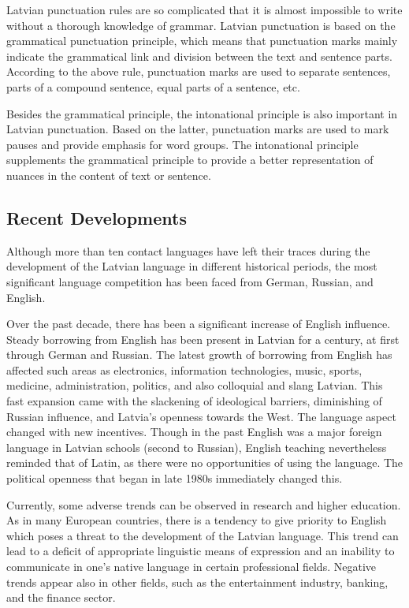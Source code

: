 \begin{multicols}{2}
Latvian punctuation rules are so complicated that it is almost impossible to write without a thorough knowledge of grammar.
Latvian punctuation is based on the grammatical punctuation principle, which means that punctuation marks mainly indicate the grammatical link and division between the text and sentence parts.
According to the above rule, punctuation marks are used to separate sentences, parts of a compound sentence, equal parts of a sentence, etc.

Besides the grammatical principle, the intonational principle is also important in Latvian punctuation.
Based on the latter, punctuation marks are used to mark pauses and provide emphasis for word groups.
The intonational principle supplements the grammatical principle to provide a better representation of nuances in the content of text or sentence.

\subsection{Recent Developments}

Although more than ten contact languages have left their traces during the development of the Latvian language in different historical periods, the most significant language competition has been faced from German, Russian, and English.

Over the past decade, there has been a significant increase of English influence.
Steady borrowing from English has been present in Latvian for a century, at first through German and Russian.
The latest growth of borrowing from English has affected such areas as electronics, information technologies, music, sports, medicine, administration, politics, and also colloquial and slang Latvian.
This fast expansion came with the slackening of ideological barriers, diminishing of Russian influence, and Latvia's openness towards the West.
The language aspect changed with new incentives.
Though in the past English was a major foreign language in Latvian schools (second to Russian), English teaching nevertheless reminded that of Latin, as there were no opportunities of using the language.
The political openness that began in late 1980s immediately changed this.

Currently, some adverse trends can be observed in research and higher education.
As in many European countries, there is a tendency to give priority to English which poses a threat to the development of the Latvian language.
This trend can lead to a deficit of appropriate linguistic means of expression and an inability to communicate in one's native language in certain professional fields.
Negative trends appear also in other fields, such as the entertainment industry, banking, and the finance sector.


\end{multicols}
